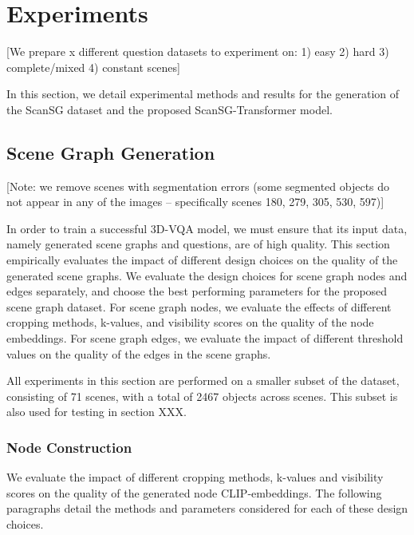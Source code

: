 %
\newpage
\chapter{Experiments}

[We prepare x different question datasets to experiment on: 1) easy 2) hard 3) complete/mixed 4) constant scenes]

In this section, we detail experimental methods and results for the generation of the ScanSG dataset and the proposed ScanSG-Transformer model.

\section{Scene Graph Generation}

[Note: we remove scenes with segmentation errors (some segmented objects do not appear in any of the images -- specifically scenes 180, 279, 305, 530, 597)]

In order to train a successful 3D-VQA model, we must ensure that its input data, namely generated scene graphs and questions, are of high quality. This section empirically evaluates the impact of different design choices on the quality of the generated scene graphs. We evaluate the design choices for scene graph nodes and edges separately, and choose the best performing parameters for the proposed scene graph dataset. For scene graph nodes, we evaluate the effects of different cropping methods, k-values, and visibility scores on the quality of the node embeddings. For scene graph edges, we evaluate the impact of different threshold values on the quality of the edges in the scene graphs.

All experiments in this section are performed on a smaller subset of the dataset, consisting of 71 scenes, with a total of 2467 objects across scenes. This subset is also used for testing in section XXX.

\subsection{Node Construction}
We evaluate the impact of different cropping methods, k-values and visibility scores on the quality of the generated node CLIP-embeddings. The following paragraphs detail the methods and parameters considered for each of these design choices.

